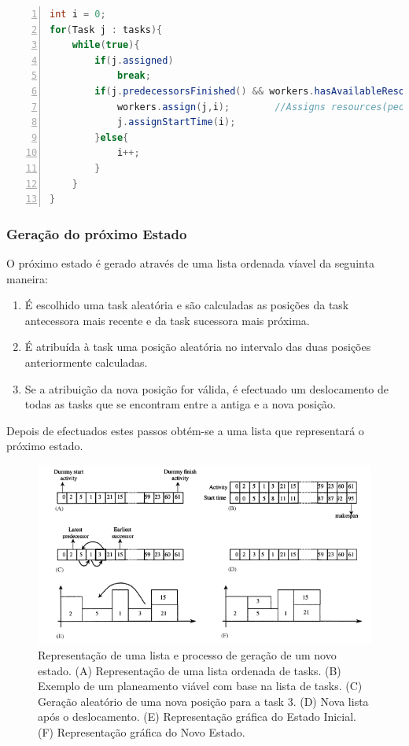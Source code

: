 \begin{titlepage}
\begin{lstlisting}[frame=single, language=java,numbers=left,numberfirstline=true]  
int i = 0;
for(Task j : tasks){
	while(true){
		if(j.assigned)
			break;
		if(j.predecessorsFinished() && workers.hasAvailableResources(j)){
			workers.assign(j,i);		//Assigns resources(people) to the task j from i until the end of the task
			j.assignStartTime(i);
		}else{
			i++;
		}
	}	
}
\end{lstlisting}

\subsubsection{Geração do próximo Estado}

O próximo estado é gerado através de uma lista ordenada víavel da seguinta maneira:
\begin{enumerate}
\item É escolhido uma task aleatória e são calculadas as posições da task antecessora mais recente e da task sucessora mais próxima.
\item É atribuída à task uma posição aleatória no intervalo das duas posições anteriormente calculadas.
\item Se a atribuição da nova posição for válida, é efectuado um deslocamento de todas as tasks que se encontram entre a antiga e a nova posição.
\end{enumerate}

Depois de efectuados estes passos obtém-se a uma lista que representará o próximo estado. 

\begin{figure}[h!]
  \includegraphics[scale=0.8]{sa.png}
  \caption{Representação de uma lista e processo de geração de um novo estado. (A) Representação de uma lista ordenada de tasks. (B) Exemplo de um planeamento viável com base na lista de tasks. (C) Geração aleatório de uma nova posição para a task 3. (D) Nova lista após o deslocamento. (E) Representação gráfica do Estado Inicial. (F) Representação gráfica do Novo Estado.}
  \label{Simulated Annealing}
\end{figure}


\end{titlepage}
